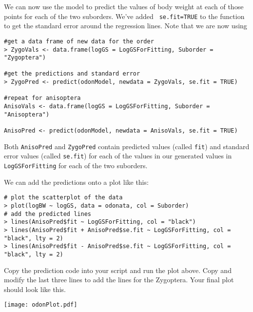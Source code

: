We can now use the model to predict the values of body weight at each 
of those points for each of the two suborders.  We've added {\tt 
se.fit=TRUE} to the function to get the standard error around the 
regression lines. Note that we are now using 

\begin{lstlisting}
#get a data frame of new data for the order
> ZygoVals <- data.frame(logGS = LogGSForFitting, Suborder = "Zygoptera")

#get the predictions and standard error
> ZygoPred <- predict(odonModel, newdata = ZygoVals, se.fit = TRUE)

#repeat for anisoptera
AnisoVals <- data.frame(logGS = LogGSForFitting, Suborder = "Anisoptera")

AnisoPred <- predict(odonModel, newdata = AnisoVals, se.fit = TRUE)
\end{lstlisting}

Both {\tt AnisoPred} and {\tt ZygoPred} contain predicted values 
(called {\tt fit}) and standard error values (called {\tt se.fit}) for 
each of the values in our generated values in {\tt LogGSForFitting} for each of the two suborders.

We can add the predictions onto a plot like this:

\begin{lstlisting}
# plot the scatterplot of the data
> plot(logBW ~ logGS, data = odonata, col = Suborder)
# add the predicted lines
> lines(AnisoPred$fit ~ LogGSForFitting, col = "black")
> lines(AnisoPred$fit + AnisoPred$se.fit ~ LogGSForFitting, col = "black", lty = 2)
> lines(AnisoPred$fit - AnisoPred$se.fit ~ LogGSForFitting, col = "black", lty = 2)
\end{lstlisting}

\begin{compactitem}[$\quad\star$]
	\item Copy the prediction code into your script and run the plot 
	above. Copy and modify the last three lines to add the lines for the 
	Zygoptera. Your final plot should look like this.
\end{compactitem}

\begin{center}
	\texttt{[image: odonPlot.pdf]}
\end{center}  

